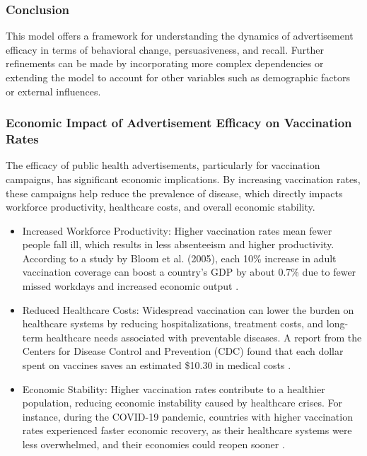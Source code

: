 \documentclass[12pt]{beamer}
\begin{document}
\begin{frame}
\frametitle{Conclusion}
This model offers a framework for understanding the dynamics of advertisement efficacy in terms of behavioral change, persuasiveness, and recall. Further refinements can be made by incorporating more complex dependencies or extending the model to account for other variables such as demographic factors or external influences.
\end{frame}
\begin{frame}
\frametitle{Economic Impact of Advertisement Efficacy on Vaccination Rates}
The efficacy of public health advertisements, particularly for vaccination campaigns, has significant economic implications. By increasing vaccination rates, these campaigns help reduce the prevalence of disease, which directly impacts workforce productivity, healthcare costs, and overall economic stability.
\end{frame}
\begin{frame}
\begin{itemize}
    \item Increased Workforce Productivity: Higher vaccination rates mean fewer people fall ill, which results in less absenteeism and higher productivity. According to a study by Bloom et al. (2005), each 10\% increase in adult vaccination coverage can boost a country’s GDP by about 0.7\% due to fewer missed workdays and increased economic output \cite{bloom2005impact}.
\end{itemize}
\end{frame}
\begin{frame}
\begin{itemize}
    \item Reduced Healthcare Costs: Widespread vaccination can lower the burden on healthcare systems by reducing hospitalizations, treatment costs, and long-term healthcare needs associated with preventable diseases. A report from the Centers for Disease Control and Prevention (CDC) found that each dollar spent on vaccines saves an estimated \$10.30 in medical costs \cite{cdc2022economic}.
\end{itemize}
\end{frame}
\begin{frame}
\begin{itemize}
    \item Economic Stability: Higher vaccination rates contribute to a healthier population, reducing economic instability caused by healthcare crises. For instance, during the COVID-19 pandemic, countries with higher vaccination rates experienced faster economic recovery, as their healthcare systems were less overwhelmed, and their economies could reopen sooner \cite{mckinsey2021recovery}.
    
\end{itemize}
\end{frame}
\end{document}
